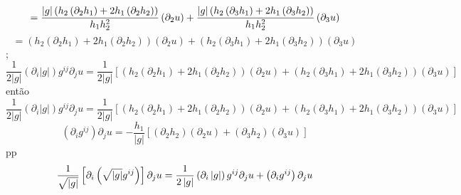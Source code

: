 \documentclass[a4paper,12pt]{article}
\begin{document}
\begin{equation*}
=\frac{\left\vert g\right\vert \left( h_{2}\left( \partial _{2}h_{1}\right)
+2h_{1}\left( \partial _{2}h_{2}\right) \right) }{h_{1}h_{2}^{2}}\left(
\partial _{2}u\right) +\frac{\left\vert g\right\vert \left( h_{2}\left(
\partial _{3}h_{1}\right) +2h_{1}\left( \partial _{3}h_{2}\right) \right) }{%
h_{1}h_{2}^{2}}\left( \partial _{3}u\right) 
\end{equation*}%
\begin{equation*}
=\left( h_{2}\left( \partial _{2}h_{1}\right) +2h_{1}\left( \partial
_{2}h_{2}\right) \right) \left( \partial _{2}u\right) +\left( h_{2}\left(
\partial _{3}h_{1}\right) +2h_{1}\left( \partial _{3}h_{2}\right) \right)
\left( \partial _{3}u\right) 
\end{equation*}%
;%
\begin{equation*}
\frac{1}{2\left\vert g\right\vert }\left( \partial _{i}\left\vert
g\right\vert \right) g^{ij}\partial _{j}u=\frac{1}{2\left\vert g\right\vert }%
\left[ \left( h_{2}\left( \partial _{2}h_{1}\right) +2h_{1}\left( \partial
_{2}h_{2}\right) \right) \left( \partial _{2}u\right) +\left( h_{2}\left(
\partial _{3}h_{1}\right) +2h_{1}\left( \partial _{3}h_{2}\right) \right)
\left( \partial _{3}u\right) \right] 
\end{equation*}%
ent\~{a}o%
\begin{equation*}
\frac{1}{2\left\vert g\right\vert }\left( \partial _{i}\left\vert
g\right\vert \right) g^{ij}\partial _{j}u=\frac{1}{2\left\vert g\right\vert }%
\left[ \left( h_{2}\left( \partial _{2}h_{1}\right) +2h_{1}\left( \partial
_{2}h_{2}\right) \right) \left( \partial _{2}u\right) +\left( h_{2}\left(
\partial _{3}h_{1}\right) +2h_{1}\left( \partial _{3}h_{2}\right) \right)
\left( \partial _{3}u\right) \right] 
\end{equation*}%
\begin{equation*}
\left( \partial _{i}g^{ij}\right) \partial _{j}u=-\frac{h_{1}}{\left\vert
g\right\vert }\left[ \left( \partial _{2}h_{2}\right) \left( \partial
_{2}u\right) +\left( \partial _{3}h_{2}\right) \left( \partial _{3}u\right) %
\right] 
\end{equation*}%
pp%
\begin{equation*}
\frac{1}{\sqrt{\left\vert g\right\vert }}\left[ \partial _{i}\left( \sqrt{%
\left\vert g\right\vert }g^{ij}\right) \right] \partial _{j}u=\frac{1}{%
2\left\vert g\right\vert }\left( \partial _{i}\left\vert g\right\vert
\right) g^{ij}\partial _{j}u+\left( \partial _{i}g^{ij}\right) \partial _{j}u
\end{equation*}%
\end{document}
